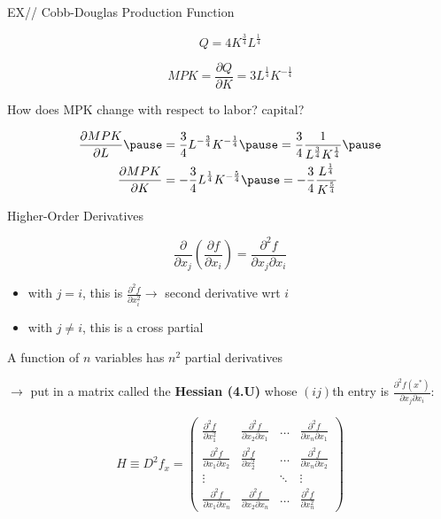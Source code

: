 \documentclass[xcolor=dvipsnames, compress, t]{beamer}
\newcommand{\vs}{\vspace{\baselineskip}}
\begin{document}
\begin{frame}{EX// Cobb-Douglas Production Function}

$$Q = 4 K^{\frac{3}{4}} L^{\frac{1}{4}}$$

$$MPK = \frac{\partial Q}{\partial K} = 3 L^{\frac{1}{4}} K^{-\frac{1}{4}}$$

\pause

\vs How does MPK change with respect to labor? capital? \pause

\begin{equation*}
\begin{aligned}
\frac{\partial MPK}{\partial L} \pause &= \frac{3}{4} L^{-\frac{3}{4}} K^{-\frac{1}{4}} \pause = \frac{3}{4} \frac{1}{L^{\frac{3}{4}}K^{\frac{1}{4}}}\pause \\ 
\frac{\partial MPK}{\partial K}  &= -\frac{3}{4} L^{\frac{1}{4}} K^{-\frac{5}{4}} \pause = -\frac{3}{4} \frac{L^{\frac{1}{4}}}{K^{\frac{5}{4}}}
\end{aligned}
\end{equation*}


\end{frame}

\begin{frame}{Higher-Order Derivatives}

$$\frac{\partial}{\partial x_j} \left( \frac{\partial f}{\partial x_i} \right) = \frac{\partial^2 f}{\partial x_j \partial x_i}$$
\pause

\begin{itemize}
\item with $j=i$, this is $\frac{\partial^2 f}{\partial x_i^2} \rightarrow$ second derivative wrt $i$
\item with $j \neq i$, this is a cross partial \pause
\end{itemize}

 A function of $n$ variables has $n^2$ partial derivatives \pause

$\rightarrow$ put in a matrix called the {\bf Hessian (4.U)} whose $(ij)$th entry is $\frac{\partial^2 f(x^*)}{\partial x_j \partial x_i}$:

$$H \equiv D^2 f_x = \begin{pmatrix} \frac{\partial^2 f}{\partial x_1^2} & \frac{\partial^2 f}{\partial x_2 \partial x_1} & \hdots & \frac{\partial^2 f}{\partial x_n \partial x_1} \\
 \frac{\partial^2 f}{\partial x_1 \partial x_2} &  \frac{\partial^2 f}{\partial x_2^2} &\hdots & \frac{\partial^2 f}{\partial x_n \partial x_2} \\
 \vdots & & \ddots & \vdots \\
 \frac{\partial^2 f}{\partial x_1 \partial x_n}   & \frac{\partial^2 f}{\partial x_2 \partial x_n} &\hdots &  \frac{\partial^2 f}{\partial x_n^2} 
 \end{pmatrix}$$

\end{frame}
\end{document}
